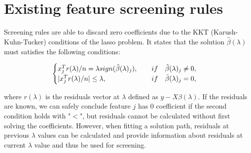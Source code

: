 \documentclass{article}
\begin{document}
\section{Existing feature screening rules}
\label{sec:existing}


Screening rules are able to discard zero coefficients due to the KKT (Karush-Kuhn-Tucker) conditions of the lasso problem. It states that the solution $\hat{\beta}(\lambda)$ must satisfies the following conditions:

\begin{equation}
    \begin{cases}
    x_j^Tr(\lambda)/n = \lambda sign(\hat{\beta}(\lambda)_j),\qquad if\quad \hat{\beta}(\lambda)_j\neq 0,\\
    |x_j^Tr(\lambda)/n| \leq \lambda,\hfill if\quad \hat{\beta}(\lambda)_j= 0,
    \end{cases}
\end{equation}

where $r(\lambda)$ is the residuals vector at $\lambda$ defined as $y-X\hat{\beta}(\lambda)$. If the residuals are known, we can safely conclude feature $j$ has 0 coefficient if the second condition holds with "$<$", but residuals cannot be calculated without first solving the coefficients. However, when fitting a solution path, residuals at previous $\lambda$ values can be calculated and provide information about residuals at current $\lambda$ value and thus be used for screening.
\end{document}
